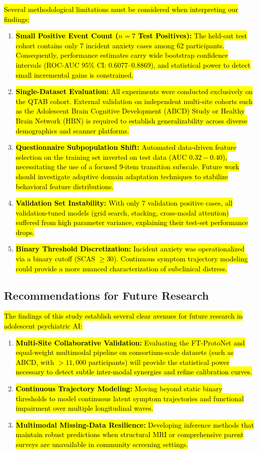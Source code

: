 \documentclass[10pt,letterpaper]{article}
\begin{document}
\hl{Several methodological limitations must be considered when interpreting our findings:}
\begin{enumerate}
    \item \hl{\textbf{Small Positive Event Count ($n=7$ Test Positives):} The held-out test cohort contains only 7 incident anxiety cases among 62 participants. Consequently, performance estimates carry wide bootstrap confidence intervals (ROC-AUC 95\% CI: 0.6077--0.8869), and statistical power to detect small incremental gains is constrained.}
    \item \hl{\textbf{Single-Dataset Evaluation:} All experiments were conducted exclusively on the QTAB cohort. External validation on independent multi-site cohorts such as the Adolescent Brain Cognitive Development (ABCD) Study or Healthy Brain Network (HBN) is required to establish generalizability across diverse demographics and scanner platforms.}
    \item \hl{\textbf{Questionnaire Subpopulation Shift:} Automated data-driven feature selection on the training set inverted on test data (AUC $0.32-0.40$), necessitating the use of a focused 9-item transition subscale. Future work should investigate adaptive domain adaptation techniques to stabilize behavioral feature distributions.}
    \item \hl{\textbf{Validation Set Instability:} With only 7 validation positive cases, all validation-tuned models (grid search, stacking, cross-modal attention) suffered from high parameter variance, explaining their test-set performance drops.}
    \item \hl{\textbf{Binary Threshold Discretization:} Incident anxiety was operationalized via a binary cutoff (SCAS $\ge 30$). Continuous symptom trajectory modeling could provide a more nuanced characterization of subclinical distress.}
\end{enumerate}

\subsection*{Recommendations for Future Research}

\hl{The findings of this study establish several clear avenues for future research in adolescent psychiatric AI:}
\begin{enumerate}
    \item \hl{\textbf{Multi-Site Collaborative Validation:} Evaluating the FT-ProtoNet and equal-weight multimodal pipeline on consortium-scale datasets (such as ABCD, with $> 11{,}000$ participants) will provide the statistical power necessary to detect subtle inter-modal synergies and refine calibration curves.}
    \item \hl{\textbf{Continuous Trajectory Modeling:} Moving beyond static binary thresholds to model continuous latent symptom trajectories and functional impairment over multiple longitudinal waves.}
    \item \hl{\textbf{Multimodal Missing-Data Resilience:} Developing inference methods that maintain robust predictions when structural MRI or comprehensive parent surveys are unavailable in community screening settings.}
\end{enumerate}
\end{document}
